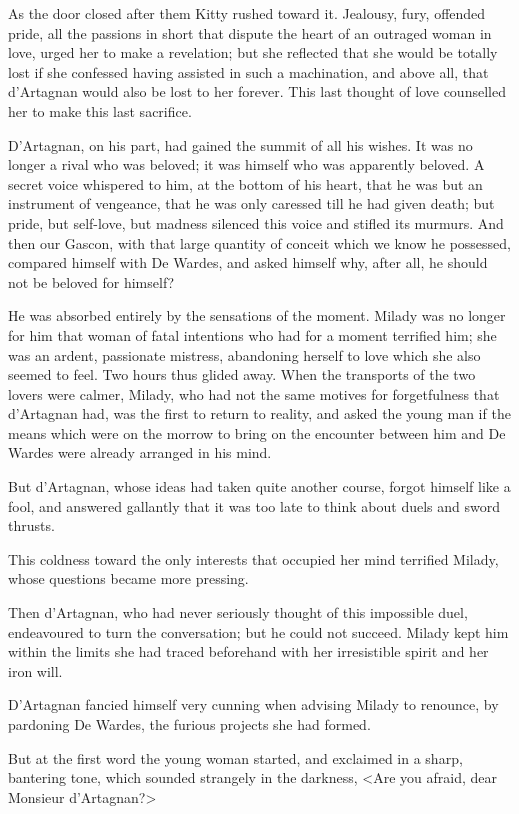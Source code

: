 As the door closed after them Kitty rushed toward it. Jealousy, fury, offended pride, all the passions in short that dispute the heart of an outraged woman in love, urged her to make a revelation; but she reflected that she would be totally lost if she confessed having assisted in such a machination, and above all, that d'Artagnan would also be lost to her forever. This last thought of love counselled her to make this last sacrifice. 

D'Artagnan, on his part, had gained the summit of all his wishes. It was no longer a rival who was beloved; it was himself who was apparently beloved. A secret voice whispered to him, at the bottom of his heart, that he was but an instrument of vengeance, that he was only caressed till he had given death; but pride, but self-love, but madness silenced this voice and stifled its murmurs. And then our Gascon, with that large quantity of conceit which we know he possessed, compared himself with De Wardes, and asked himself why, after all, he should not be beloved for himself? 

He was absorbed entirely by the sensations of the moment. Milady was no longer for him that woman of fatal intentions who had for a moment terrified him; she was an ardent, passionate mistress, abandoning herself to love which she also seemed to feel. Two hours thus glided away. When the transports of the two lovers were calmer, Milady, who had not the same motives for forgetfulness that d'Artagnan had, was the first to return to reality, and asked the young man if the means which were on the morrow to bring on the encounter between him and De Wardes were already arranged in his mind. 

But d'Artagnan, whose ideas had taken quite another course, forgot himself like a fool, and answered gallantly that it was too late to think about duels and sword thrusts. 

This coldness toward the only interests that occupied her mind terrified Milady, whose questions became more pressing. 

Then d'Artagnan, who had never seriously thought of this impossible duel, endeavoured to turn the conversation; but he could not succeed. Milady kept him within the limits she had traced beforehand with her irresistible spirit and her iron will. 

D'Artagnan fancied himself very cunning when advising Milady to renounce, by pardoning De Wardes, the furious projects she had formed. 

But at the first word the young woman started, and exclaimed in a sharp, bantering tone, which sounded strangely in the darkness, <Are you afraid, dear Monsieur d'Artagnan?> 

